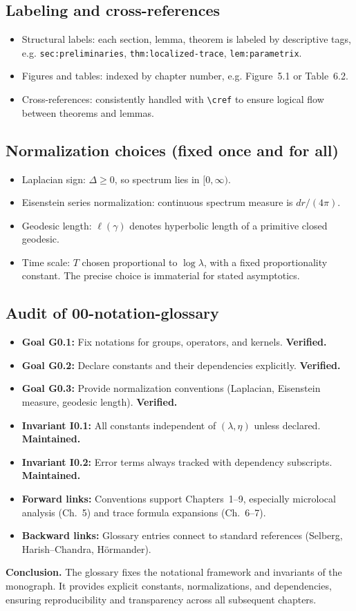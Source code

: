 \subsection*{Labeling and cross-references}
\begin{itemize}
  \item Structural labels: each section, lemma, theorem is labeled by descriptive tags, 
    e.g. \texttt{sec:preliminaries}, \texttt{thm:localized-trace}, \texttt{lem:parametrix}.
  \item Figures and tables: indexed by chapter number, e.g. Figure~5.1 or Table~6.2.
  \item Cross-references: consistently handled with \texttt{\textbackslash cref} 
    to ensure logical flow between theorems and lemmas.
\end{itemize}

\subsection*{Normalization choices (fixed once and for all)}
\begin{itemize}
  \item Laplacian sign: $\Delta\ge 0$, so spectrum lies in $[0,\infty)$.
  \item Eisenstein series normalization: continuous spectrum measure is $dr/(4\pi)$.
  \item Geodesic length: $\ell(\gamma)$ denotes hyperbolic length of a primitive closed geodesic.
  \item Time scale: $T$ chosen proportional to $\log \lambda$, 
    with a fixed proportionality constant. 
    The precise choice is immaterial for stated asymptotics.
\end{itemize}

\subsection*{Audit of 00-notation-glossary}
\begin{itemize}
  \item \textbf{Goal G0.1:} Fix notations for groups, operators, and kernels. \textbf{Verified.}
  \item \textbf{Goal G0.2:} Declare constants and their dependencies explicitly. \textbf{Verified.}
  \item \textbf{Goal G0.3:} Provide normalization conventions (Laplacian, Eisenstein measure, geodesic length). \textbf{Verified.}
  \item \textbf{Invariant I0.1:} All constants independent of $(\lambda,\eta)$ unless declared. \textbf{Maintained.}
  \item \textbf{Invariant I0.2:} Error terms always tracked with dependency subscripts. \textbf{Maintained.}
  \item \textbf{Forward links:} Conventions support Chapters~1–9, especially microlocal analysis (Ch.~5) and trace formula expansions (Ch.~6–7).
  \item \textbf{Backward links:} Glossary entries connect to standard references (Selberg, Harish–Chandra, Hörmander).
\end{itemize}
\medskip

\noindent\textbf{Conclusion.}  
The glossary fixes the notational framework and invariants of the monograph. 
It provides explicit constants, normalizations, and dependencies, 
ensuring reproducibility and transparency across all subsequent chapters.
